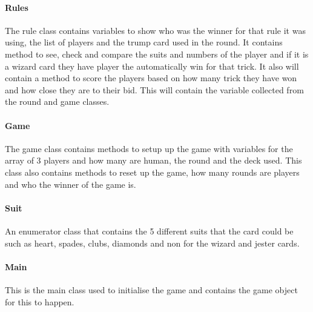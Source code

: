\paragraph{Rules}
The rule class contains variables to show who was the winner for that rule it was using, the list of players and the trump card used in the round. It contains method to see, check and compare the suits and numbers of the player and if it is a wizard card they have player the automatically win for that trick. It also will contain a method to score the players based on how many trick they have won and how close they are to their bid. This will contain the variable collected from the round and game classes.
\paragraph{Game}
The game class contains methods to setup up the game with variables for the array of 3 players and how many are human, the round and the deck used. This class also contains methods to reset up the game, how many rounds are players and who the winner of the game is. 
\paragraph{Suit}
An enumerator class that contains the 5 different suits that the card could be such as heart, spades, clubs, diamonds and non for the wizard and jester cards.
\paragraph{Main}
This is the main class used to initialise the game and contains the game object for this to happen.
